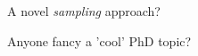 \documentclass[first=dgreen,second=purple,logo=redque]{aaltoslides}
\begin{document}
\begin{frame}{A novel \textit{sampling} approach?}
\begin{figure}
	\label{fig:sketch2}  
\end{figure}
Anyone fancy a 'cool' PhD topic?
\end{frame}
\end{document}
